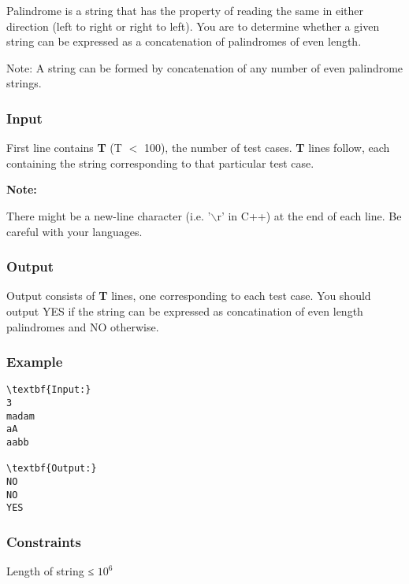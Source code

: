 







   Palindrome is a string that has the property of reading the same in either direction (left to right or right to left). You are to determine whether a given string can be expressed as a concatenation of palindromes of even length.  

   Note: A string can be formed by concatenation of any number of even palindrome strings.  

\subsubsection{   Input  }

   First line contains   \textbf{    T   }   (T $<$ 100), the number of test cases.   \textbf{    T   }   lines follow, each containing the string corresponding to that particular test case.  

\textbf{    Note:   }

   There might be a new-line character (i.e. '$\backslash$r' in C++) at the end of each line. Be careful with your languages.  

\subsubsection{   Output  }

   Output consists of   \textbf{    T   }   lines, one corresponding to each test case. You should output   YES   if the string can be expressed as concatination of even length palindromes and   NO   otherwise.  

\subsubsection{   Example  }
\begin{verbatim}
\textbf{Input:}
3
madam
aA
aabb

\textbf{Output:}
NO
NO
YES 
\end{verbatim}

\subsubsection{   Constraints  }

   Length of string ≤ $10^{6}$

